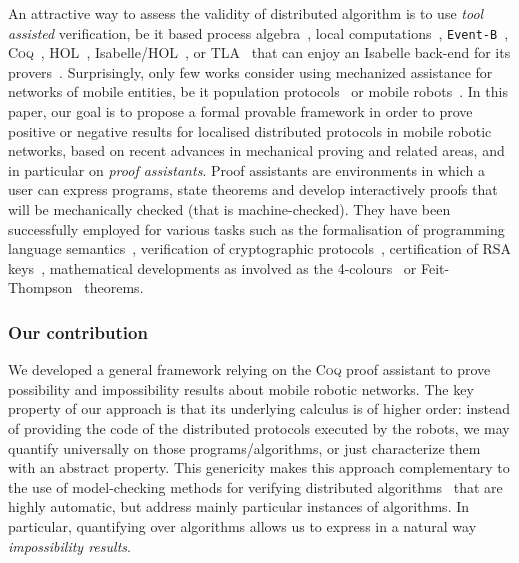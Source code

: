 \documentclass[11pt,a4]{llncs}
\newcommand{\x}{\xspace}
\newcommand{\coq}{\textsc{Coq}\x}
\begin{document}
An attractive way to assess the validity of distributed
algorithm is to use \emph{tool assisted} verification, be it based
process algebra~\cite{bezem97fac,fokkink07}, local
computations~\cite{litovsky99hb}, \texttt{Event-B}~\cite{cansell07},
\coq~\cite{casteran09scss}, HOL~\cite{chou95cj}, Isabelle/HOL~\cite{kuefner12ifiptcs},
or TLA~\cite{lamport82jacm,DBLP:conf/wdag/Lamport11a} that can enjoy
an Isabelle back-end for its
provers~\cite{cousineau12fm}. Surprisingly, only few works consider
using mechanized assistance for networks of mobile entities, be it
population protocols~\cite{deng09tase,clement11icdcs} or mobile robots~\cite{devismes12sss,bonnet12sss}. 
In this paper, our goal is to propose a formal provable
framework in order to prove positive or negative results for
localised distributed protocols in mobile robotic networks,
based on recent advances in mechanical proving and related areas, and
in particular on \emph{proof assistants}. Proof assistants are
environments in which a user can express programs, state theorems and
develop interactively proofs that will be mechanically checked (that
is machine-checked). They have been successfully employed for various
tasks such as the formalisation of programming language
semantics~\cite{Leroy-backend,Mccarthy67correctnessof}, verification
of cryptographic protocols~\cite{DBLP:conf/ccs/AlmeidaBBBKB12},
certification of RSA keys~\cite{thery07tphols}, mathematical
developments as involved as the 4-colours~\cite{Gonthier4color}
or Feit-Thompson~\cite{DBLP:conf/popl/Gonthier13} theorems. 

\subsubsection*{Our contribution}

We developed a general framework relying on the \coq proof assistant
to prove possibility and impossibility results about mobile robotic
networks. 
The key property of our approach is that its underlying calculus is 
of higher order: instead of providing the code of the distributed
protocols executed by the robots, we may quantify universally on 
those programs/algorithms, or
just characterize them with an abstract property.
This genericity makes this approach complementary to the use of
model-checking methods for verifying distributed
algorithms~\cite{cadilhac06avocs,clement11icdcs,devismes12sss} that
are highly automatic, but address mainly particular instances of algorithms.
In particular, quantifying over algorithms allows us to express in a
natural way \emph{impossibility results}.
\end{document}
